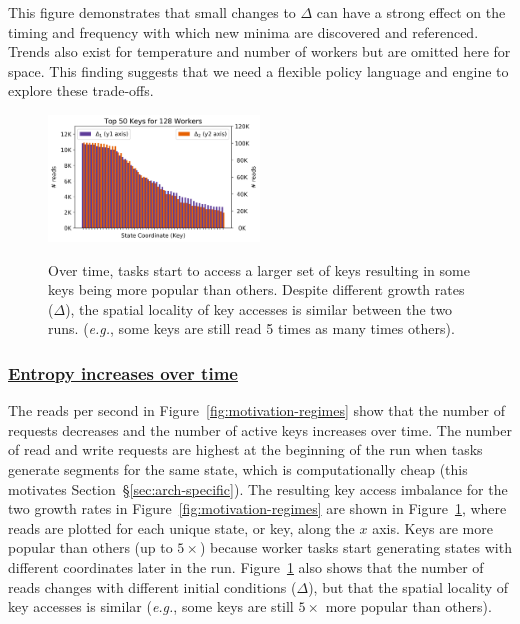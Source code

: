 This figure demonstrates that small changes to \(\Delta\) can have a strong
effect on the timing and frequency with which new minima are discovered and
referenced.  Trends also exist for temperature and number of workers but are
omitted here for space.  This finding suggests that we need a flexible policy
language and engine to explore these trade-offs.  

\begin{figure}[t]
  \noindent\includegraphics[width=0.5\textwidth]{figures/methodology-keys.png}\\
  \caption{Over time, tasks start to access a larger set of keys resulting in
some keys being more popular than others.  Despite different growth rates
(\(\Delta\)), the spatial locality of key accesses is similar between the two
runs.  ({\it e.g.}, some keys are still read 5 times as many times others).
\label{fig:methodology-keys}}
\end{figure}

\subsubsection{\underline{Entropy increases over time}} The reads per second in
Figure~\ref{fig:motivation-regimes} show that the number of requests decreases
and the number of active keys increases over time.  The number of read and
write requests are highest at the beginning of the run when tasks generate
segments for the same state, which is computationally cheap (this motivates
Section~\S\ref{sec:arch-specific}).  The resulting key access imbalance for the
two growth rates in Figure~\ref{fig:motivation-regimes} are shown in
Figure~\ref{fig:methodology-keys}, where reads are plotted for each unique
state, or key, along the \(x\) axis. Keys are more popular than others (up to
\(5\times\)) because worker tasks start generating states with different
coordinates later in the run.  Figure~\ref{fig:methodology-keys} also shows that the
number of reads changes with different initial conditions (\(\Delta\)), but
that the spatial locality of key accesses is similar ({\it e.g.}, some keys are
still \(5\times\) more popular than others).
